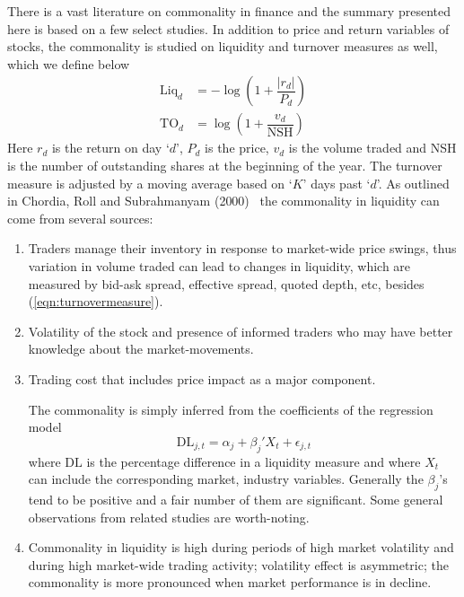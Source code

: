 There is a vast literature on commonality in finance and the summary presented here is based on a few select studies. In addition to price and return variables of stocks, the commonality is studied on liquidity and turnover measures as well, which we define below
	\begin{equation}\label{eqn:turnovermeasure}
	\begin{split}
	\text{Liq}_d&= - \log \left( 1 + \dfrac{|r_d|}{P_d} \right) \\
	\text{TO}_d&= \log \left( 1 + \dfrac{v_d}{\text{NSH}}\right)
	\end{split}
	\end{equation}
Here $r_d$ is the return on day `$d$', $P_d$ is the price, $v_d$ is the volume traded and NSH is the number of outstanding shares at the beginning of the year. The turnover measure is adjusted by a moving average based on `$K$' days past `$d$'. As outlined in Chordia, Roll and Subrahmanyam (2000)~\cite{chordia} the commonality in liquidity can come from several sources: 
	\begin{enumerate}[--]
	\item Traders manage their inventory in response to market-wide price swings, thus variation in volume traded can lead to changes in liquidity, which are measured by bid-ask spread, effective spread, quoted depth, etc, besides (\ref{eqn:turnovermeasure}).
	\item Volatility of the stock and presence of informed traders who may have better knowledge about the market-movements. 
	\item Trading cost that includes price impact as a major component. 
	
	The commonality is simply inferred from the coefficients of the regression model
		\begin{equation}\label{eqn:coefficreg}
		\text{DL}_{j,t}= \alpha_j + \beta_j' X_t + \epsilon_{j,t}
		\end{equation}
	where $\text{DL}$ is the percentage difference in a liquidity measure and where $X_t$ can include the corresponding market, industry variables. Generally the $\beta_j$'s tend to be positive and a fair number of them are significant. Some general observations from related studies are worth-noting. 
	\item Commonality in liquidity is high during periods of high market volatility and during high market-wide trading activity; volatility effect is asymmetric; the commonality is more pronounced when market performance is in decline. 
	\end{enumerate}



